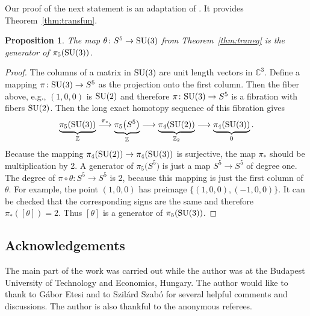 \documentclass[10pt,a4paper]{amsart}
\numberwithin{equation}{section}
\newtheorem{Proposition}[Theorem]{Proposition}
 { \theoremstyle{definition}
\newtheorem{Definition}[Theorem]{Definition}
\newtheorem{Remark}[Theorem]{Remark} }
\newcommand{\SZ}{\mathbb{Z}} %
\newcommand{\SC}{\mathbb{C}} %
\begin{document}
Our proof of the next statement is an adaptation of \cite[Proposition~2]{chaves96complex}. It provides Theorem~\ref{thm:transfun}.
\begin{Proposition} The map $\theta\colon S^5 \rightarrow {\rm SU}(3)$ from Theorem~{\rm \ref{thm:traneq}} is the generator of $\pi_{5}({\rm SU}(3))$.
\end{Proposition}
\begin{proof} The columns of a matrix in ${\rm SU}(3)$ are unit length vectors in $\SC^3$. Define a mapping $\pi\colon {\rm SU}(3) \rightarrow S^5$ as the projection onto the first column. Then the fiber above, e.g., $(1,0,0)$ is ${\rm SU}(2)$ and therefore $\pi\colon {\rm SU}(3) \rightarrow S^5$ is a fibration with fibers ${\rm SU}(2)$. Then the long exact homotopy sequence of this fibration gives
 \[ \underbrace{\pi_5({\rm SU}(3))}_{\SZ} \overset{\pi_\ast}{\longrightarrow} \underbrace{\pi_5\big(S^5\big)}_{\SZ} \longrightarrow \underbrace{\pi_4({\rm SU}(2))}_{\SZ_2} \longrightarrow \underbrace{\pi_4({\rm SU}(3))}_{0}.\]
 Because the mapping $\pi_4({\rm SU}(2)) \rightarrow \pi_4({\rm SU}(3))$ is surjective, the map $\pi_\ast$ should be multiplication by 2. A generator of $\pi_5\big(S^5\big)$ is just a map $S^5 \rightarrow S^5$ of degree one. The degree of $\pi \circ \theta\colon S^5 \rightarrow S^5$ is 2, because this mapping is just the first column of $\theta$. For example, the point $(1,0,0)$ has preimage $\{(1,0,0),(-1,0,0)\}$. It can be checked that the corresponding signs are the same and therefore $\pi_\ast([\theta])=2$. Thus $[\theta]$ is a generator of $\pi_{5}({\rm SU}(3))$.
\end{proof}

\subsection*{Acknowledgements}
The main part of the work was carried out while the author was at the Budapest University of Technology and Economics, Hungary. The author would like to thank to G\'abor Etesi and to Szil\'ard Szab\'o for several helpful comments and discussions. The author is also thankful to the anonymous referees.

\end{document}
